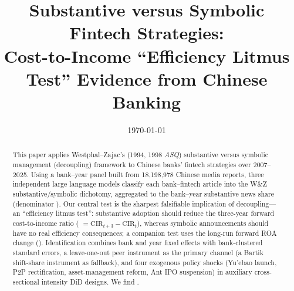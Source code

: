 




\title{Substantive versus Symbolic Fintech Strategies:\\Cost-to-Income ``Efficiency Litmus Test'' Evidence from Chinese Banking}
\author{}
\date{\today}


\maketitle

\begin{abstract}
This paper applies Westphal--Zajac's (1994, 1998 \emph{ASQ}) substantive versus
symbolic management (decoupling) framework to Chinese banks' fintech strategies
over 2007--2025. Using a bank--year panel built from 18{,}198{,}978 Chinese
media reports, three independent large language models classify each
bank--fintech article into the W\&Z substantive/symbolic dichotomy, aggregated
to the bank--year substantive news share  (denominator
). Our central test is the sharpest falsifiable
implication of decoupling---an ``efficiency litmus test'': substantive adoption
should reduce the three-year forward cost-to-income ratio
( $= \mathrm{CIR}_{t+3}-\mathrm{CIR}_{t}$),
whereas symbolic announcements should have no real efficiency consequences; a
companion test uses the long-run forward ROA change
(). Identification combines bank and year
fixed effects with bank-clustered standard errors, a leave-one-out peer
instrument as the primary channel (a Bartik shift-share instrument as
fallback), and four exogenous policy shocks (Yu'ebao launch, P2P rectification,
asset-management reform, Ant IPO suspension) in auxiliary cross-sectional
intensity DiD designs. We find \@.
\end{abstract}

